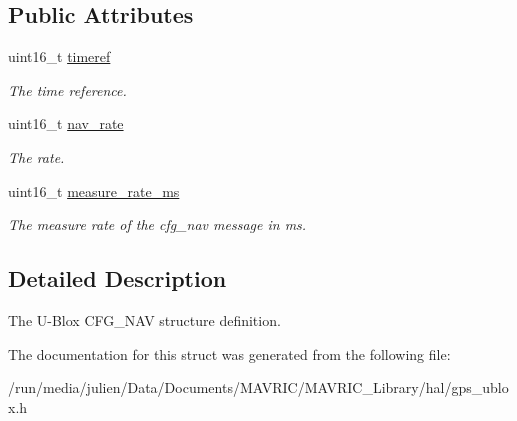 \subsection*{Public Attributes}
\begin{DoxyCompactItemize}
\item 
\hypertarget{structubx__cfg__nav__rate__t_a7c28d25350c51ee40ef5bb8758ba2970}{uint16\+\_\+t \hyperlink{structubx__cfg__nav__rate__t_a7c28d25350c51ee40ef5bb8758ba2970}{timeref}}\label{structubx__cfg__nav__rate__t_a7c28d25350c51ee40ef5bb8758ba2970}

\begin{DoxyCompactList}\small\item\em The time reference. \end{DoxyCompactList}\item 
\hypertarget{structubx__cfg__nav__rate__t_a26a4f63336ab89b1f29b3f3d4803a219}{uint16\+\_\+t \hyperlink{structubx__cfg__nav__rate__t_a26a4f63336ab89b1f29b3f3d4803a219}{nav\+\_\+rate}}\label{structubx__cfg__nav__rate__t_a26a4f63336ab89b1f29b3f3d4803a219}

\begin{DoxyCompactList}\small\item\em The rate. \end{DoxyCompactList}\item 
\hypertarget{structubx__cfg__nav__rate__t_a737a4dc3928d7d1b465658d5236ae33d}{uint16\+\_\+t \hyperlink{structubx__cfg__nav__rate__t_a737a4dc3928d7d1b465658d5236ae33d}{measure\+\_\+rate\+\_\+ms}}\label{structubx__cfg__nav__rate__t_a737a4dc3928d7d1b465658d5236ae33d}

\begin{DoxyCompactList}\small\item\em The measure rate of the cfg\+\_\+nav message in ms. \end{DoxyCompactList}\end{DoxyCompactItemize}


\subsection{Detailed Description}
The U-\/\+Blox C\+F\+G\+\_\+\+N\+A\+V structure definition. 

The documentation for this struct was generated from the following file\+:\begin{DoxyCompactItemize}
\item 
/run/media/julien/\+Data/\+Documents/\+M\+A\+V\+R\+I\+C/\+M\+A\+V\+R\+I\+C\+\_\+\+Library/hal/gps\+\_\+ublox.\+h\end{DoxyCompactItemize}
